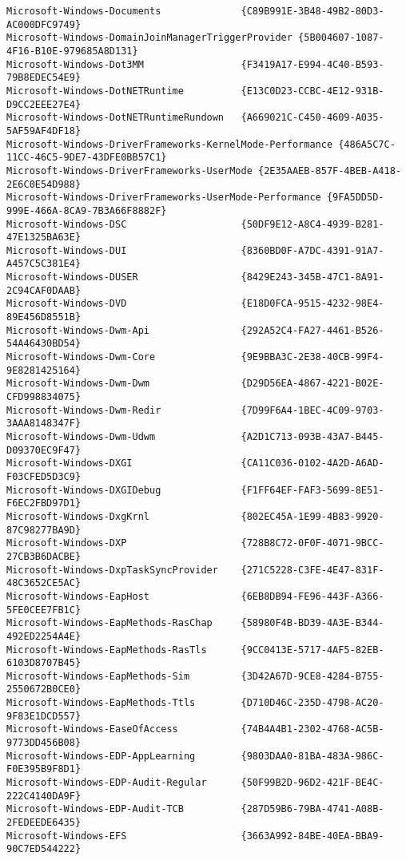 \documentclass{report}
\begin{document}
\begin{lstlisting}[breaklines=true,basicstyle=\tiny]
Microsoft-Windows-Documents              {C89B991E-3B48-49B2-80D3-AC000DFC9749}
Microsoft-Windows-DomainJoinManagerTriggerProvider {5B004607-1087-4F16-B10E-979685A8D131}
Microsoft-Windows-Dot3MM                 {F3419A17-E994-4C40-B593-79B8EDEC54E9}
Microsoft-Windows-DotNETRuntime          {E13C0D23-CCBC-4E12-931B-D9CC2EEE27E4}
Microsoft-Windows-DotNETRuntimeRundown   {A669021C-C450-4609-A035-5AF59AF4DF18}
Microsoft-Windows-DriverFrameworks-KernelMode-Performance {486A5C7C-11CC-46C5-9DE7-43DFE0BB57C1}
Microsoft-Windows-DriverFrameworks-UserMode {2E35AAEB-857F-4BEB-A418-2E6C0E54D988}
Microsoft-Windows-DriverFrameworks-UserMode-Performance {9FA5DD5D-999E-466A-8CA9-7B3A66F8882F}
Microsoft-Windows-DSC                    {50DF9E12-A8C4-4939-B281-47E1325BA63E}
Microsoft-Windows-DUI                    {8360BD0F-A7DC-4391-91A7-A457C5C381E4}
Microsoft-Windows-DUSER                  {8429E243-345B-47C1-8A91-2C94CAF0DAAB}
Microsoft-Windows-DVD                    {E18D0FCA-9515-4232-98E4-89E456D8551B}
Microsoft-Windows-Dwm-Api                {292A52C4-FA27-4461-B526-54A46430BD54}
Microsoft-Windows-Dwm-Core               {9E9BBA3C-2E38-40CB-99F4-9E8281425164}
Microsoft-Windows-Dwm-Dwm                {D29D56EA-4867-4221-B02E-CFD998834075}
Microsoft-Windows-Dwm-Redir              {7D99F6A4-1BEC-4C09-9703-3AAA8148347F}
Microsoft-Windows-Dwm-Udwm               {A2D1C713-093B-43A7-B445-D09370EC9F47}
Microsoft-Windows-DXGI                   {CA11C036-0102-4A2D-A6AD-F03CFED5D3C9}
Microsoft-Windows-DXGIDebug              {F1FF64EF-FAF3-5699-8E51-F6EC2FBD97D1}
Microsoft-Windows-DxgKrnl                {802EC45A-1E99-4B83-9920-87C98277BA9D}
Microsoft-Windows-DXP                    {728B8C72-0F0F-4071-9BCC-27CB3B6DACBE}
Microsoft-Windows-DxpTaskSyncProvider    {271C5228-C3FE-4E47-831F-48C3652CE5AC}
Microsoft-Windows-EapHost                {6EB8DB94-FE96-443F-A366-5FE0CEE7FB1C}
Microsoft-Windows-EapMethods-RasChap     {58980F4B-BD39-4A3E-B344-492ED2254A4E}
Microsoft-Windows-EapMethods-RasTls      {9CC0413E-5717-4AF5-82EB-6103D8707B45}
Microsoft-Windows-EapMethods-Sim         {3D42A67D-9CE8-4284-B755-2550672B0CE0}
Microsoft-Windows-EapMethods-Ttls        {D710D46C-235D-4798-AC20-9F83E1DCD557}
Microsoft-Windows-EaseOfAccess           {74B4A4B1-2302-4768-AC5B-9773DD456B08}
Microsoft-Windows-EDP-AppLearning        {9803DAA0-81BA-483A-986C-F0E395B9F8D1}
Microsoft-Windows-EDP-Audit-Regular      {50F99B2D-96D2-421F-BE4C-222C4140DA9F}
Microsoft-Windows-EDP-Audit-TCB          {287D59B6-79BA-4741-A08B-2FEDEEDE6435}
Microsoft-Windows-EFS                    {3663A992-84BE-40EA-BBA9-90C7ED544222}

\end{lstlisting}
\end{document}
